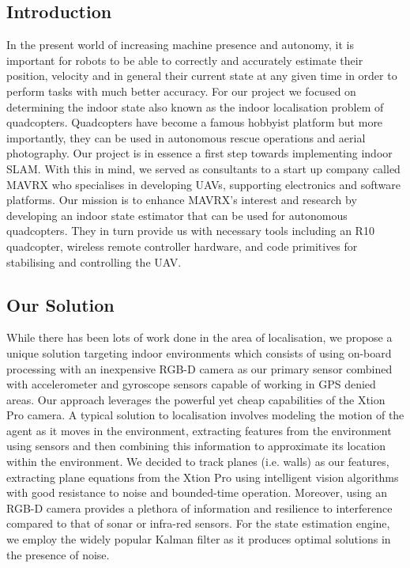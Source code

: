 \documentclass[]{article}
\begin{document}
{\subsection{Introduction}
In the present world of increasing machine presence and autonomy, it is important for robots to be able to correctly and accurately estimate their position, velocity and in general their current state at any given time in order to perform tasks with much better accuracy. For our project we focused on determining the indoor state also known as the indoor localisation problem of quadcopters. Quadcopters have become a famous hobbyist platform but more importantly, they can be used in autonomous rescue operations and aerial photography. Our project is in essence a first step towards implementing indoor SLAM. With this in mind, we served as consultants to a start up company called MAVRX who specialises in developing UAVs, supporting electronics and software platforms. Our mission is to enhance MAVRX's interest and research by developing an indoor state estimator that can be used for autonomous quadcopters. They in turn provide us with necessary tools including an R10 quadcopter, wireless remote controller hardware, and code primitives for stabilising and controlling the UAV.
\subsection{Our Solution}
While there has been lots of work done in the area of localisation, we propose a unique solution targeting indoor environments which consists of using on-board processing with an inexpensive RGB-D camera as our primary sensor combined with accelerometer and gyroscope sensors capable of working in GPS denied areas. Our approach leverages the powerful yet cheap capabilities of the Xtion Pro camera. A typical solution to localisation involves modeling the motion of the agent as it moves in the environment, extracting features from the environment using sensors and then combining this information to approximate its location within the environment. We decided to track planes (i.e. walls) as our features, extracting plane equations from the Xtion Pro using intelligent vision algorithms with good resistance to noise and bounded-time operation. Moreover, using an RGB-D camera provides a plethora of information and resilience to interference compared to that of sonar or infra-red sensors. For the state estimation engine, we employ the widely popular Kalman filter as it produces optimal solutions in the presence of noise.  
}
\end{document}

